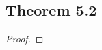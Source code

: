 \documentclass[../../main.tex]{subfiles}
\begin{document}
\subsection{Theorem 5.2}
\begin{wts}

\end{wts}
\begin{proof}

\end{proof}
\end{document}
